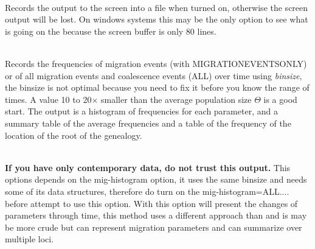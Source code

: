\begin{description}
\item{}\\
Records the output to the screen into a file when turned on, otherwise the screen output will be lost. On windows systems this may be the only option to see what is going on the because the screen buffer is only 80 lines.

\item{}\\
Records the frequencies of migration events (with MIGRATIONEVENTSONLY) or of all migration events and coalescence events (ALL) over time using \textsl{binsize}, the binsize is not optimal because you need to fix it before you know the range of times. A value 10 to 20$\times$ smaller than the average population size $\Theta$ is a good start. The output is a histogram of frequencies for each parameter, and a summary table of the average frequencies and a table of the frequency of the location of the root of the genealogy.

\item{}\\
{\bf If you have only contemporary data, do not trust this output.}
This options depends on the mig-histogram option, it uses the same binsize and needs some of its data structures, therefore do turn on the mig-histogram=ALL.... before attempt to use this option. With this option \migrate will present the changes of parameters through time, this method uses a different approach than \beast and is may be more crude but can represent migration parameters and can summarize over multiple loci.
\end{description}

